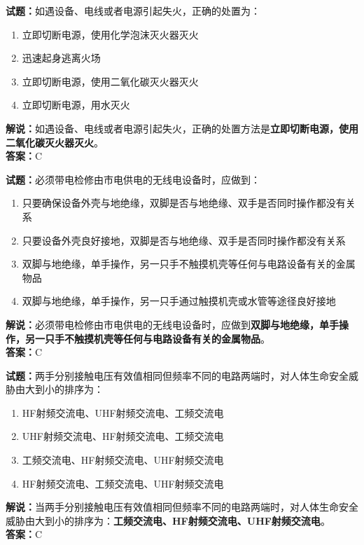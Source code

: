 \documentclass{ctexbook}
\begin{document}
\vspace{\baselineskip}

\noindent\textbf{试题：}如遇设备、电线或者电源引起失火，正确的处置为：
\begin{enumerate}[leftmargin=3em]
  \item 立即切断电源，使用化学泡沫灭火器灭火
  \item 迅速起身逃离火场
  \item 立即切断电源，使用二氧化碳灭火器灭火
  \item 立即切断电源，用水灭火
\end{enumerate}
\noindent\textbf{解说：}如遇设备、电线或者电源引起失火，正确的处置方法是\textbf{立即切断电源，使用二氧化碳灭火器灭火}。\\\noindent\textbf{答案：}C

\vspace{\baselineskip}

\noindent\textbf{试题：}必须带电检修由市电供电的无线电设备时，应做到：
\begin{enumerate}[leftmargin=3em]
  \item 只要确保设备外壳与地绝缘，双脚是否与地绝缘、双手是否同时操作都没有关系
  \item 只要设备外壳良好接地，双脚是否与地绝缘、双手是否同时操作都没有关系
  \item 双脚与地绝缘，单手操作，另一只手不触摸机壳等任何与电路设备有关的金属物品
  \item 双脚与地绝缘，单手操作，另一只手通过触摸机壳或水管等途径良好接地
\end{enumerate}
\noindent\textbf{解说：}必须带电检修由市电供电的无线电设备时，应做到\textbf{双脚与地绝缘，单手操作，另一只手不触摸机壳等任何与电路设备有关的金属物品}。\\\noindent\textbf{答案：}C
\vspace{\baselineskip}

\noindent\textbf{试题：}两手分别接触电压有效值相同但频率不同的电路两端时，对人体生命安全威胁由大到小的排序为：
\begin{enumerate}[leftmargin=3em]
  \item HF射频交流电、UHF射频交流电、工频交流电
  \item UHF射频交流电、HF射频交流电、工频交流电
  \item 工频交流电、HF射频交流电、UHF射频交流电
  \item HF射频交流电、工频交流电、UHF射频交流电
\end{enumerate}
\noindent\textbf{解说：}当两手分别接触电压有效值相同但频率不同的电路两端时，对人体生命安全威胁由大到小的排序为：\textbf{工频交流电、HF射频交流电、UHF射频交流电}。\\\noindent\textbf{答案：}C
\end{document}
